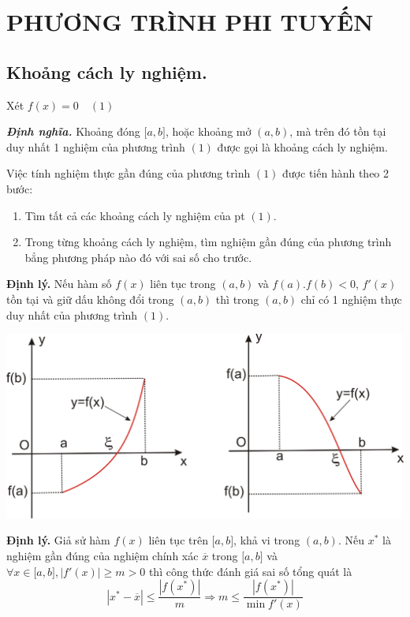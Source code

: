 \documentclass[12pt, a4paper]{report}
\def\DN{\textbf{\textit{Định nghĩa. }}}
\begin{document}
\chapter{PHƯƠNG TRÌNH PHI TUYẾN}
\section{Khoảng cách ly nghiệm.}
Xét $f(x) = 0 \quad (1)$

\DN Khoảng đóng $\lbrack a,b \rbrack$, hoặc khoảng mở $(a,b)$, mà trên đó tồn tại duy nhất 1 nghiệm của phương trình $(1)$ được gọi là khoảng cách ly nghiệm.

Việc tính nghiệm thực gần đúng của phương trình $(1)$ được tiến hành theo 2 bước:
\begin{enumerate}
    \item Tìm tất cả các khoảng cách ly nghiệm của pt $(1)$.
    \item Trong từng khoảng cách ly nghiệm, tìm nghiệm gần đúng của phương trình bẳng phương pháp nào đó với sai số cho trước.
\end{enumerate}

\textbf{Định lý.} Nếu hàm số $f(x)$ liên tục trong $(a,b)$ và $f(a).f(b)<0$, $f'(x)$ tồn tại và giữ dấu không đổi trong $(a,b)$ thì trong $(a,b)$ chỉ có 1 nghiệm thực duy nhất của phương trình $(1)$.
\begin{center}
    \includegraphics[scale = 0.38]{1.png}
\end{center}

\textbf{Định lý.} Giả sử hàm $f(x)$ liên tục trên $\lbrack a,b \rbrack$, khả vi trong $(a,b)$. Nếu $x^*$ là nghiệm gần đúng của nghiệm chính xác $\overline{x}$ trong $\lbrack a,b \rbrack$ và $\forall x \in \lbrack a,b \rbrack, |f'(x)| \geq m > 0$ thì công thức đánh giá sai số tổng quát là
\[
    |x^* - \overline{x}| \leq \frac{|f(x^*)|}{m} \Rightarrow m \leq \dfrac{|f(x^*)|}{\min f'(x)} 
\]
\end{document}
